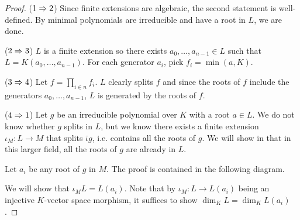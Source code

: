 \documentclass[../book.tex]{subfiles}
\begin{document}
\begin{proof}
    ($1 \Rightarrow 2$) 
        Since finite extensions are algebraic, the second statement is well-defined.
        By minimal polynomials are irreducible and have a root in $L$, we are done. 
        
    ($2 \Rightarrow 3$)
        $L$ is a finite extension so 
        there exists $a_0,\dots,a_{n-1} \in L$ such that $L = K(a_0,\dots,a_{n-1})$.
        For each generator $a_i$, pick $f_i = \min(a,K)$. 
    
    ($3 \Rightarrow 4$)
        Let $f = \prod_{i\in n} f_i$. 
        $L$ clearly splits $f$ and 
        since the roots of $f$ include the generators $a_0,\dots,a_{n-1}$,
        $L$ is generated by the roots of $f$. 
        
    ($4 \Rightarrow 1$) 
        Let $g$ be an irreducible polynomial over $K$ with a root $a \in L$. 
        We do not know whether $g$ splits in $L$, 
        but we know there exists a finite extension $\iota_M : L \to M$
        that splits $\bar\iota g$, i.e. contains all the roots of $g$. 
        We will show in that in this larger field, 
        all the roots of $g$ are already in $L$. 
        
        Let $a_i$ be any root of $g$ in $M$.  
        The proof is contained in the following diagram. 
        \begin{figure} [H]
            \centering
        \end{figure}
        We will show that $\iota_M L = L(a_i)$.
        Note that by $\iota_M : L \to L(a_i)$ being 
        an injective $K$-vector space morphism, 
        it suffices to show $\dim_K L = \dim_K L(a_i)$.
        

\end{proof}
\end{document}
